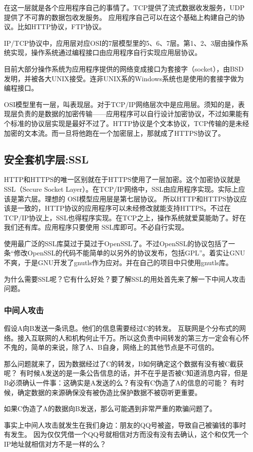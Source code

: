 在这一层就是各个应用程序自己的事情了。TCP提供了流式数据收发服务，UDP提供了不可靠的数据包收发服务。
应用程序自己可以在这个基础上构建自己的协议。比如HTTP协议，FTP协议。

IP/TCP协议中，应用层对应OSI的7层模型里的5、6、7层。第1、2、3层由操作系统实现，操作系统通过编程接口由应用程序自行实现应用层协议。

目前大部分操作系统为应用程序提供的网络变成接口为套接字（socket），由BSD发明，并被各大UNIX接受。连非UNIX系的Windows系统也是使用的套接字做为编程接口。

OSI模型里有一层，叫表现层。对于TCP/IP网络层次中是应用层。须知的是，表现层负责的是数据的加密传输——应用程序可以自行设计加密协议，不过如果能有个标准的协议层实现是最好不过了。HTTP协议是个文本协议，TCP传输的是未经加密的文本流。而一旦将他跑在一个加密层上，那就成了HTTPS协议了。

\subsection{安全套机字层:SSL}

HTTP和HTTPS的唯一区别就在于HTTPS使用了一层加密。这个加密协议就是SSL（Secure Socket Layer）。在TCP/IP网络中，SSL由应用程序实现。实际上应该是第六层。理想的 OSI模型应用层是第七层协议。
所以HTTP和HTTPS协议应该是一致的，HTTP协议的应用程序可以未经修改就能支持HTTPS。不过在TCP/IP协议上，SSL也得程序实现。在TCP之上，操作系统就爱莫能助了。好在我们还有库。应用程序只要使用 SSL库即可。不必自行实现。

使用最广泛的SSL库莫过于莫过于OpenSSL了。不过OpenSSL的协议包括了一条“修改OpenSSL的代码不能简单的以另外的协议发布，包括GPL”。着实让GNU不爽，于是GNU开发了gnutls作为应对。并在自己的项目中只使用gnutls库。

为什么需要SSL呢？它有什么好处？要了解SSL的用处首先来了解一下中间人攻击问题。

\begin{insertnote}
\subsubsection{中间人攻击}

假设A向B发送一条讯息。他们的信息需要经过C的转发。
互联网是个分布式的网络。接入互联网的人和机构何止千万。所以这负责中间转发的第三方一定会有心怀不鬼的，简单的来说，除了A、B自身，网络上的其他节点是不可信的。 

那么问题就来了，因为数据经过了C的转发，B如何确定这个数据有没有被C截获呢？
有时候A发送的是一条公告信息的话，并不在乎是否被C知道消息内容，但是B必须确认一件事：这确实是A发送的么？有没有C伪造了A的信息的可能？ 有时候，确定数据的来源确保没有被伪造比保护数据不被窃听更重要。

如果C伪造了A的数据向B发送，那么可能遇到非常严重的欺骗问题了。

事实上中间人攻击就发生在我们身边：朋友的QQ号被盗，导致自己被骗钱的事时有发生。
因为仅仅凭借一个QQ号就相信对方而没有没有去确认，这个和仅凭一个IP地址就相信对方不是一样的么？

\end{insertnote}

